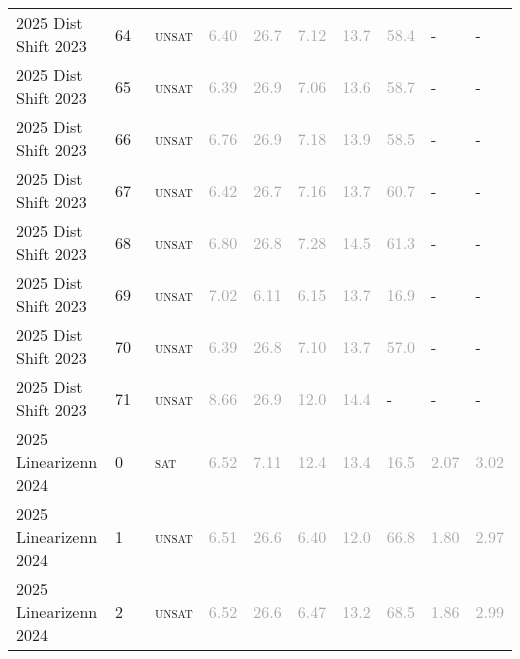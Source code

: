 \begin{center}
{\begin{longtable}{@{}llllllllll@{}}
2025 Dist Shift 2023 & 64 & ~\textsc{unsat} & \textcolor{darkgray}{6.40} & \textcolor{darkgray}{26.7} & \textcolor{darkgray}{7.12} & \textcolor{darkgray}{13.7} & \textcolor{darkgray}{58.4} & - & - \\
2025 Dist Shift 2023 & 65 & ~\textsc{unsat} & \textcolor{darkgray}{6.39} & \textcolor{darkgray}{26.9} & \textcolor{darkgray}{7.06} & \textcolor{darkgray}{13.6} & \textcolor{darkgray}{58.7} & - & - \\
2025 Dist Shift 2023 & 66 & ~\textsc{unsat} & \textcolor{darkgray}{6.76} & \textcolor{darkgray}{26.9} & \textcolor{darkgray}{7.18} & \textcolor{darkgray}{13.9} & \textcolor{darkgray}{58.5} & - & - \\
2025 Dist Shift 2023 & 67 & ~\textsc{unsat} & \textcolor{darkgray}{6.42} & \textcolor{darkgray}{26.7} & \textcolor{darkgray}{7.16} & \textcolor{darkgray}{13.7} & \textcolor{darkgray}{60.7} & - & - \\
2025 Dist Shift 2023 & 68 & ~\textsc{unsat} & \textcolor{darkgray}{6.80} & \textcolor{darkgray}{26.8} & \textcolor{darkgray}{7.28} & \textcolor{darkgray}{14.5} & \textcolor{darkgray}{61.3} & - & - \\
2025 Dist Shift 2023 & 69 & ~\textsc{unsat} & \textcolor{darkgray}{7.02} & \textcolor{darkgray}{6.11} & \textcolor{darkgray}{6.15} & \textcolor{darkgray}{13.7} & \textcolor{darkgray}{16.9} & - & - \\
2025 Dist Shift 2023 & 70 & ~\textsc{unsat} & \textcolor{darkgray}{6.39} & \textcolor{darkgray}{26.8} & \textcolor{darkgray}{7.10} & \textcolor{darkgray}{13.7} & \textcolor{darkgray}{57.0} & - & - \\
2025 Dist Shift 2023 & 71 & ~\textsc{unsat} & \textcolor{darkgray}{8.66} & \textcolor{darkgray}{26.9} & \textcolor{darkgray}{12.0} & \textcolor{darkgray}{14.4} & - & - & - \\
\midrule
2025 Linearizenn 2024 & 0 & ~\textsc{sat} & \textcolor{darkgray}{6.52} & \textcolor{darkgray}{7.11} & \textcolor{darkgray}{12.4} & \textcolor{darkgray}{13.4} & \textcolor{darkgray}{16.5} & \textcolor{darkgray}{2.07} & \textcolor{darkgray}{3.02} \\
2025 Linearizenn 2024 & 1 & ~\textsc{unsat} & \textcolor{darkgray}{6.51} & \textcolor{darkgray}{26.6} & \textcolor{darkgray}{6.40} & \textcolor{darkgray}{12.0} & \textcolor{darkgray}{66.8} & \textcolor{darkgray}{1.80} & \textcolor{darkgray}{2.97} \\
2025 Linearizenn 2024 & 2 & ~\textsc{unsat} & \textcolor{darkgray}{6.52} & \textcolor{darkgray}{26.6} & \textcolor{darkgray}{6.47} & \textcolor{darkgray}{13.2} & \textcolor{darkgray}{68.5} & \textcolor{darkgray}{1.86} & \textcolor{darkgray}{2.99} \\

\end{longtable}}
\end{center}
